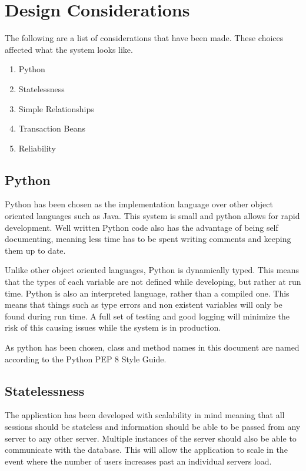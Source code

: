 \section{Design Considerations}

\par
The following are a list of considerations that have been made. These choices affected what the system looks like.

\begin{enumerate}
	\item Python
	\item Statelessness
	\item Simple Relationships
	\item Transaction Beans
	\item Reliability
\end{enumerate}

\subsection{Python}
\par
Python has been chosen as the implementation language over other object oriented languages such as Java. This system is small and python allows for rapid development. Well written Python code also has the advantage of being self documenting, meaning less time has to be spent writing comments and keeping them up to date.

\par
Unlike other object oriented languages, Python is dynamically typed. This means that the types of each variable are not defined while developing, but rather at run time. Python is also an interpreted language, rather than a compiled one. This means that things such as type errors and non existent variables will only be found during run time. A full set of testing and good logging will minimize the risk of this causing issues while the system is in production.

\par
As python has been chosen, class and method names in this document are named according to the Python PEP 8 Style Guide.


\subsection{Statelessness}
\par
The application has been developed with scalability in mind meaning that all sessions should be stateless and information should be able to be passed from any server to any other server. Multiple instances of the server should also be able to communicate with the database. This will allow the application to scale in the event where the number of users increases past an individual servers load.


